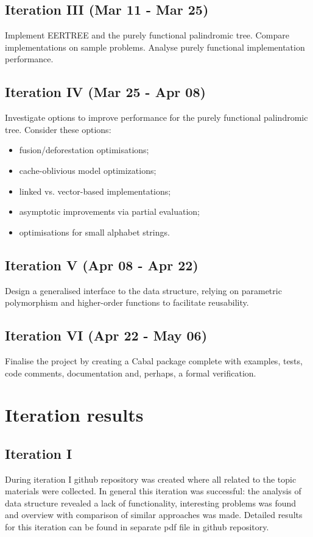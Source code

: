 \subsection{Iteration III (Mar 11 - Mar 25)}

Implement EERTREE and the purely functional palindromic tree.
Compare implementations on sample problems.
Analyse purely functional implementation performance.

\subsection{Iteration IV (Mar 25 - Apr 08)}

Investigate options to improve performance for
the purely functional palindromic tree.
Consider these options:

\begin{itemize}
  \item fusion/deforestation optimisations;
  \item cache-oblivious model optimizations;
  \item linked vs. vector-based implementations;
  \item asymptotic improvements via partial evaluation;
  \item optimisations for small alphabet strings.
\end{itemize}

\subsection{Iteration V (Apr 08 - Apr 22)}

Design a generalised interface to the data structure,
relying on parametric polymorphism and higher-order functions
to facilitate reusability.

\subsection{Iteration VI (Apr 22 - May 06)}

Finalise the project by creating a Cabal package complete with
examples, tests, code comments, documentation and, perhaps, a
formal verification.

\section{Iteration results}

\subsection{Iteration I}
During iteration I github repository\cite{khazhix} was created where all related to the topic materials were collected. In general this iteration was successful: the analysis of data structure revealed a lack of functionality, interesting problems was found and overview with comparison of similar approaches was made. Detailed results for this iteration can be found in separate pdf file\cite{khazhix1} in github repository.

